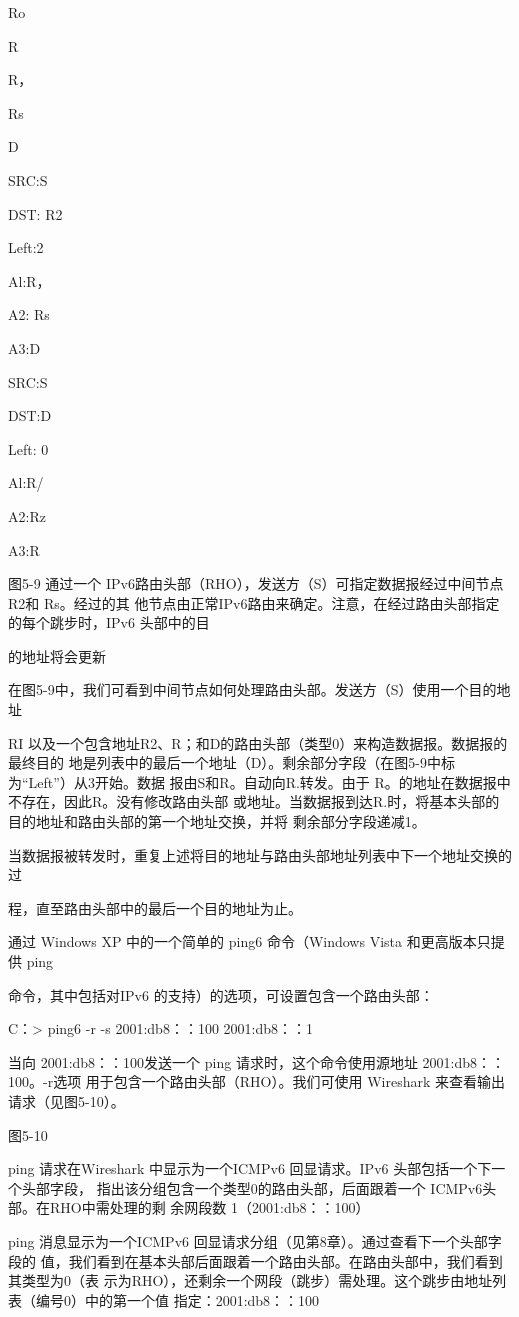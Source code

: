 Ro

R

R，

Rs

D

SRC:S

DST: R2

Left:2

Al:R，

A2: Rs

A3:D

SRC:S

DST:D

Left: 0

Al:R/

A2:Rz

A3:R

图5-9 通过一个 IPv6路由头部（RHO），发送方（S）可指定数据报经过中间节点 R2和 Rs。经过的其
他节点由正常IPv6路由来确定。注意，在经过路由头部指定的每个跳步时，IPv6 头部中的目

的地址将会更新

在图5-9中，我们可看到中间节点如何处理路由头部。发送方（S）使用一个目的地址

RI 以及一个包含地址R2、R；和D的路由头部（类型0）来构造数据报。数据报的最终目的
地是列表中的最后一个地址（D）。剩余部分字段（在图5-9中标为“Left”）从3开始。数据
报由S和R。自动向R.转发。由于 R。的地址在数据报中不存在，因此R。没有修改路由头部
或地址。当数据报到达R.时，将基本头部的目的地址和路由头部的第一个地址交换，并将
剩余部分字段递减1。

当数据报被转发时，重复上述将目的地址与路由头部地址列表中下一个地址交换的过

程，直至路由头部中的最后一个目的地址为止。

通过 Windows XP 中的一个简单的 ping6 命令（Windows Vista 和更高版本只提供 ping

命令，其中包括对IPv6 的支持）的选项，可设置包含一个路由头部：

C：> ping6 -r -s 2001:db8：：100 2001:db8：：1

当向 2001:db8：：100发送一个 ping 请求时，这个命令使用源地址 2001:db8：：100。-r选项
用于包含一个路由头部（RHO）。我们可使用 Wireshark 来查看输出请求（见图5-10）。

图5-10

ping 请求在Wireshark 中显示为一个ICMPv6 回显请求。IPv6 头部包括一个下一个头部字段，
指出该分组包含一个类型0的路由头部，后面跟着一个 ICMPv6头部。在RHO中需处理的剩
余网段数 1（2001:db8：：100）

ping 消息显示为一个ICMPv6 回显请求分组（见第8章）。通过查看下一个头部字段的
值，我们看到在基本头部后面跟着一个路由头部。在路由头部中，我们看到其类型为0（表
示为RHO），还剩余一个网段（跳步）需处理。这个跳步由地址列表（编号0）中的第一个值
指定：2001:db8：：100

